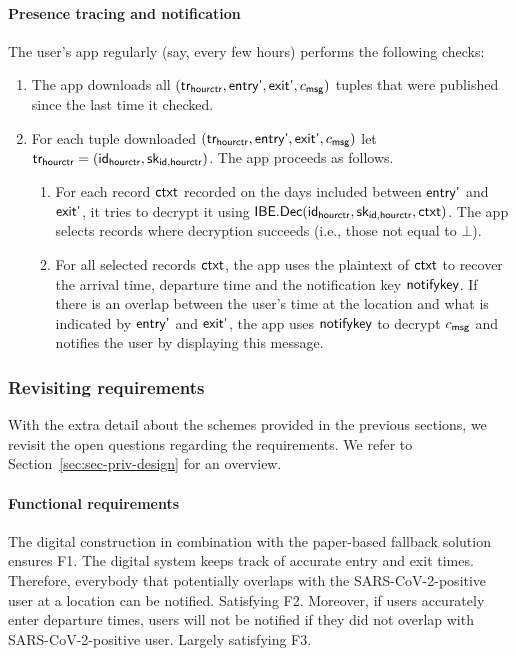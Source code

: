 \paragraph{Presence tracing and notification}
The user’s app regularly (say, every few hours) performs the following checks:
\begin{enumerate}
\item The app downloads all $(\textsf{tr}_{\textsf{hourctr}}, \textsf{entry'}, \textsf{exit'}, c_{\textsf{msg}})$ tuples that were published since the last time it checked.
\item For each tuple downloaded $(\textsf{tr}_{\textsf{hourctr}}, \textsf{entry'}, \textsf{exit'}, c_{\textsf{msg}})$ let 
  $\textsf{tr}_{\textsf{hourctr}} = (\textsf{id}_{\textsf{hourctr}}, \textsf{sk}_{\textsf{id},\textsf{hourctr}})$. The app proceeds as follows.
  \begin{enumerate}
  \item For each record $\textsf{ctxt}$ recorded on the days included between $\textsf{entry'}$ and $\textsf{exit'}$, it tries to decrypt it using $\textsf{IBE.Dec}(\textsf{id}_{\textsf{hourctr}},\allowbreak \textsf{sk}_{\textsf{id},\textsf{hourctr}},\allowbreak \textsf{ctxt})$. The app selects records where decryption succeeds (i.e., those not equal to $\bot$).
  \item For all selected records $\textsf{ctxt}$, the app uses the plaintext of $\textsf{ctxt}$ to recover the arrival time, departure time and the notification key $\textsf{notifykey}$. If there is an overlap between the user's time at the location and what is indicated by $\textsf{entry'}$ and $\textsf{exit'}$, the app uses $\textsf{notifykey}$ to decrypt $c_{\textsf{msg}}$ and notifies the user by displaying this message.
  \end{enumerate}
\end{enumerate}
  
\subsubsection{Revisiting requirements}
With the extra detail about the \name schemes provided in the previous sections, we revisit the open questions regarding the requirements. We refer to Section~\ref{sec:sec-priv-design} for an overview.

\paragraph{Functional requirements}
The digital construction in combination with the paper-based fallback solution ensures F1. The digital system keeps track of accurate entry and exit times. Therefore, everybody that potentially overlaps with the SARS-CoV-2-positive user at a location can be notified. Satisfying F2. Moreover, if users accurately enter departure times, users will not be notified if they did not overlap with SARS-CoV-2-positive user. Largely satisfying F3.

